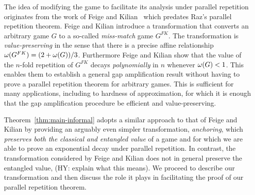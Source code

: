 
The idea of modifying  the game to facilitate its analysis under parallel repetition originates from the work of Feige and Kilian~\cite{feige2000two} which predates Raz's parallel repetition theorem. 
Feige and Kilian introduce a transformation that converts an arbitrary game $G$ to a so-called \emph{miss-match} game $G^{FK}$. The transformation is \emph{value-preserving} in the sense that there is a precise affine relationship $\omega(G^{FK}) = (2 + \omega(G))/3$. Furthermore Feige and Kilian show that the value of the $n$-fold repetition of $G^{FK}$ decays \emph{polynomially} in $n$ whenever $\omega(G)<1$. This enables them to establish a general gap amplification result without having to prove a parallel repetition theorem for arbitrary games. This is sufficient for many applications, including to hardness of approximation, for which it is enough that the gap amplification procedure be efficient and value-preserving. 

Theorem~\ref{thm:main-informal} adopts a similar approach to that of Feige and Kilian by providing an arguably even simpler transformation,
\emph{anchoring}, which \emph{preserves both the classical and entangled value} of a game and for which we are able to prove an exponential decay under parallel repetition. In contrast, the transformation considered by Feige and Kilian does not in general preserve the entangled value, (HY: explain what this means). We proceed to describe our transformation and then discuss the role it plays in facilitating the proof of our parallel repetition theorem. 


